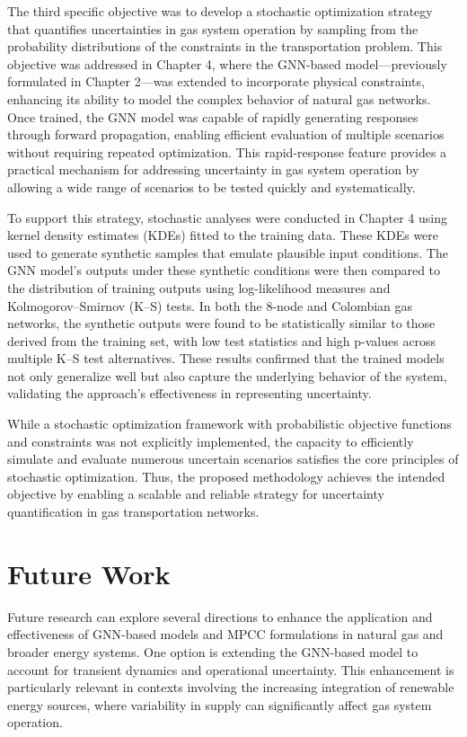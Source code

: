 The third specific objective was to develop a stochastic optimization strategy that quantifies uncertainties in gas system operation by sampling from the probability distributions of the constraints in the transportation problem. This objective was addressed in Chapter 4, where the GNN-based model—previously formulated in Chapter 2—was extended to incorporate physical constraints, enhancing its ability to model the complex behavior of natural gas networks. Once trained, the GNN model was capable of rapidly generating responses through forward propagation, enabling efficient evaluation of multiple scenarios without requiring repeated optimization. This rapid-response feature provides a practical mechanism for addressing uncertainty in gas system operation by allowing a wide range of scenarios to be tested quickly and systematically.

To support this strategy, stochastic analyses were conducted in Chapter 4 using kernel density estimates (KDEs) fitted to the training data. These KDEs were used to generate synthetic samples that emulate plausible input conditions. The GNN model’s outputs under these synthetic conditions were then compared to the distribution of training outputs using log-likelihood measures and Kolmogorov–Smirnov (K–S) tests. In both the 8-node and Colombian gas networks, the synthetic outputs were found to be statistically similar to those derived from the training set, with low test statistics and high p-values across multiple K–S test alternatives. These results confirmed that the trained models not only generalize well but also capture the underlying behavior of the system, validating the approach's effectiveness in representing uncertainty.

While a stochastic optimization framework with probabilistic objective functions and constraints was not explicitly implemented, the capacity to efficiently simulate and evaluate numerous uncertain scenarios satisfies the core principles of stochastic optimization. Thus, the proposed methodology achieves the intended objective by enabling a scalable and reliable strategy for uncertainty quantification in gas transportation networks.


\section{Future Work}

Future research can explore several directions to enhance the application and effectiveness of GNN-based models and MPCC formulations in natural gas and broader energy systems. One option is extending the GNN-based model to account for transient dynamics and operational uncertainty. This enhancement is particularly relevant in contexts involving the increasing integration of renewable energy sources, where variability in supply can significantly affect gas system operation.

